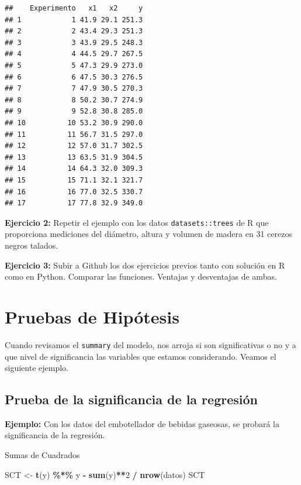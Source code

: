 \documentclass[
]{book}
\newenvironment{Shaded}{\begin{snugshade}}{\end{snugshade}}
\newcommand{\DecValTok}[1]{\textcolor[rgb]{0.00,0.00,0.81}{#1}}
\newcommand{\FunctionTok}[1]{\textcolor[rgb]{0.13,0.29,0.53}{\textbf{#1}}}
\newcommand{\NormalTok}[1]{#1}
\newcommand{\OtherTok}[1]{\textcolor[rgb]{0.56,0.35,0.01}{#1}}
\newcommand{\SpecialCharTok}[1]{\textcolor[rgb]{0.81,0.36,0.00}{\textbf{#1}}}
\begin{document}
\begin{verbatim}
##    Experimento   x1   x2     y
## 1            1 41.9 29.1 251.3
## 2            2 43.4 29.3 251.3
## 3            3 43.9 29.5 248.3
## 4            4 44.5 29.7 267.5
## 5            5 47.3 29.9 273.0
## 6            6 47.5 30.3 276.5
## 7            7 47.9 30.5 270.3
## 8            8 50.2 30.7 274.9
## 9            9 52.8 30.8 285.0
## 10          10 53.2 30.9 290.0
## 11          11 56.7 31.5 297.0
## 12          12 57.0 31.7 302.5
## 13          13 63.5 31.9 304.5
## 14          14 64.3 32.0 309.3
## 15          15 71.1 32.1 321.7
## 16          16 77.0 32.5 330.7
## 17          17 77.8 32.9 349.0
\end{verbatim}

\textbf{Ejercicio 2:} Repetir el ejemplo con los datos \texttt{datasets::trees} de R que proporciona mediciones
del diámetro, altura y volumen de madera en 31 cerezos negros talados.

\textbf{Ejercicio 3:} Subir a Github los dos ejercicios previos tanto con solución en R como en Python. Comparar las funciones. Ventajas y desventajas de ambas.

\section{Pruebas de Hipótesis}\label{pruebas-de-hipuxf3tesis}

Cuando revisamos el \texttt{summary} del modelo, nos arroja si son significativas o no y a que nivel de significancia las variables que estamos considerando. Veamos el siguiente ejemplo.

\subsection{Prueba de la significancia de la regresión}\label{prueba-de-la-significancia-de-la-regresiuxf3n}

\textbf{Ejemplo:} Con los datos del embotellador de bebidas gaseosas, se probará la significancia de la regresión.

Sumas de Cuadrados

\begin{Shaded}
\begin{Highlighting}[]
\NormalTok{SCT }\OtherTok{\textless{}{-}} \FunctionTok{t}\NormalTok{(y) }\SpecialCharTok{\%*\%}\NormalTok{ y }\SpecialCharTok{{-}}  \FunctionTok{sum}\NormalTok{(y)}\SpecialCharTok{**}\DecValTok{2} \SpecialCharTok{/} \FunctionTok{nrow}\NormalTok{(datos)}
\NormalTok{SCT}
\end{Highlighting}
\end{Shaded}
\end{document}
